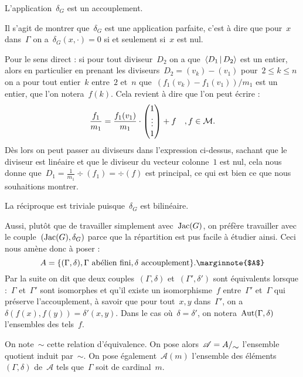 	\begin{prop}
		L'application~$\delta_G$ est un accouplement.
	\end{prop}
	\begin{dem}
		Il s'agit de montrer que~$\delta_G$ est une application parfaite, c'est à dire que pour~$x$ dans~$\Gamma$ on a~$\delta_G(x,\cdot) = 0$ si et seulement si~$x$ est nul.
		
		Pour le sens direct : si pour tout diviseur~$D_2$ on a que~$\left<D_1\,|\,D_2\right>$ est un entier, alors en particulier en prenant les diviseurs~$D_2 = (v_k) - (v_1)$ pour~$2\leq k \leq n$ on a pour tout entier~$k$ entre~$2$ et~$n$ que~$(f_1(v_k)-f_1(v_1))/m_1$ est un entier, que l'on notera~$f(k)$. Cela revient à dire que l'on peut écrire :
		\[
			\frac{f_1}{m_1} = \frac{f_1(v_1)}{m_1} \cdot \begin{pmatrix} 1 \\ \vdots \\ 1 \end{pmatrix} + f \quad , f\in\mathcal{M}.
		\]
		Dès lors on peut passer au diviseurs dans l'expression ci-dessus, sachant que le diviseur est linéaire et que le diviseur du vecteur colonne~$1$ est nul, cela nous donne que~$D_1 = \frac{1}{m_1}\div(f_1) = \div(f)$ est principal, ce qui est bien ce que nous souhaitions montrer.
		
		La réciproque est triviale puisque~$\delta_G$ est bilinéaire.
	\end{dem}
	Aussi, plutôt que de travailler simplement avec~$\operatorname{Jac}(G)$, on préfère travailler avec le couple~$(\operatorname{Jac}(G),\delta_G)$ parce que la répartition est pus facile à étudier ainsi. Ceci nous amène donc à poser :
	\[
		A = \{(\Gamma,\delta), \Gamma\text{ abélien fini}, \delta\text{ accouplement}\}.\text{\marginnote{$A$}}
	\]
	Par la suite on dit que deux couples~$(\Gamma,\delta)$ et~$(\Gamma',\delta')$ sont équivalents lorsque :~$\Gamma$ et~$\Gamma'$ sont isomorphes et qu'il existe un isomorphisme~$f$ entre~$\Gamma'$ et~$\Gamma$ qui préserve l'accouplement, à savoir que pour tout~$x,y$ dans~$\Gamma'$, on a~$\delta(f(x),f(y)) = \delta'(x,y)$. Dans le cas où~$\delta = \delta'$, on notera~$\Aut(\Gamma,\delta)$\marginnote{$\Aut(\Gamma,\delta)$} l'ensembles des tels~$f$.
	
	On note~$\sim$ cette relation d'équivalence. On pose alors~$\mathscr{A} = \quotient{A}{\sim}$ l'ensemble quotient induit par~$\sim$. On pose également~$\mathscr{A}(m)$  l'ensemble des éléments~$(\Gamma,\delta)$ de~$\mathscr{A}$ tels que~$\Gamma$ soit de cardinal~$m$.